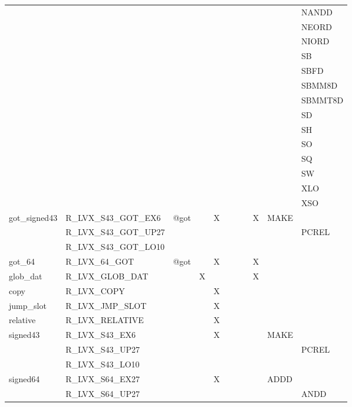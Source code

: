 {\begin{tabular}{|l|l|l|l|l|l|l|l|l|l|l|}
 & & & & & & & & & & \textsf{NANDD} \\
 & & & & & & & & & & \textsf{NEORD} \\
 & & & & & & & & & & \textsf{NIORD} \\
 & & & & & & & & & & \textsf{SB} \\
 & & & & & & & & & & \textsf{SBFD} \\
 & & & & & & & & & & \textsf{SBMM8D} \\
 & & & & & & & & & & \textsf{SBMMT8D} \\
 & & & & & & & & & & \textsf{SD} \\
 & & & & & & & & & & \textsf{SH} \\
 & & & & & & & & & & \textsf{SO} \\
 & & & & & & & & & & \textsf{SQ} \\
 & & & & & & & & & & \textsf{SW} \\
 & & & & & & & & & & \textsf{XLO} \\
 & & & & & & & & & & \textsf{XSO} \\
\hline
\textsf{got\_signed43} & \textsf{R\_LVX\_S43\_GOT\_EX6} & \textsf{@got} & \textsf{} & \textsf{X} & \textsf{} & \textsf{} & \textsf{} & \textsf{X} & \textsf{MAKE} \\
 & \textsf{R\_LVX\_S43\_GOT\_UP27} & & & & & & & & & \textsf{PCREL} \\
 & \textsf{R\_LVX\_S43\_GOT\_LO10} & & & & & & & & & \\
\hline
\textsf{got\_64} & \textsf{R\_LVX\_64\_GOT} & \textsf{@got} & \textsf{} & \textsf{X} & \textsf{} & \textsf{} & \textsf{} & \textsf{X} & \textsf{} \\
\hline
\textsf{glob\_dat} & \textsf{R\_LVX\_GLOB\_DAT} & \textsf{} & \textsf{X} & \textsf{} & \textsf{} & \textsf{} & \textsf{} & \textsf{X} & \textsf{} \\
\hline
\textsf{copy} & \textsf{R\_LVX\_COPY} & \textsf{} & \textsf{} & \textsf{X} & \textsf{} & \textsf{} & \textsf{} & \textsf{} & \textsf{} \\
\hline
\textsf{jump\_slot} & \textsf{R\_LVX\_JMP\_SLOT} & \textsf{} & \textsf{} & \textsf{X} & \textsf{} & \textsf{} & \textsf{} & \textsf{} & \textsf{} \\
\hline
\textsf{relative} & \textsf{R\_LVX\_RELATIVE} & \textsf{} & \textsf{} & \textsf{X} & \textsf{} & \textsf{} & \textsf{} & \textsf{} & \textsf{} \\
\hline
\textsf{signed43} & \textsf{R\_LVX\_S43\_EX6} & \textsf{} & \textsf{} & \textsf{X} & \textsf{} & \textsf{} & \textsf{} & \textsf{} & \textsf{MAKE} \\
 & \textsf{R\_LVX\_S43\_UP27} & & & & & & & & & \textsf{PCREL} \\
 & \textsf{R\_LVX\_S43\_LO10} & & & & & & & & & \\
\hline
\textsf{signed64} & \textsf{R\_LVX\_S64\_EX27} & \textsf{} & \textsf{} & \textsf{X} & \textsf{} & \textsf{} & \textsf{} & \textsf{} & \textsf{ADDD} \\
 & \textsf{R\_LVX\_S64\_UP27} & & & & & & & & & \textsf{ANDD} \\
\hline\end{tabular}
}
\smallskip

